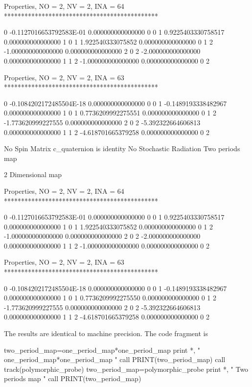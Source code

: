 \documentclass[english,12pt,article]{article} %
\begin{document}
{{{\begin{example2}
 Properties, NO =    2, NV =    2, INA =   64
 *********************************************

   0 -0.1127016653792583E-01   0.000000000000000       0  0
   1  0.9225403330758517       0.000000000000000       1  0
   1   1.922540333075852       0.000000000000000       0  1
   2  -1.000000000000000       0.000000000000000       2  0
   2  -2.000000000000000       0.000000000000000       1  1
   2  -1.000000000000000       0.000000000000000       0  2


 Properties, NO =    2, NV =    2, INA =   63
 *********************************************

   0 -0.1084202172485504E-18   0.000000000000000       0  0
   1 -0.1489193338482967       0.000000000000000       1  0
   1  0.7736209992275551       0.000000000000000       0  1
   2  -1.773620999227555       0.000000000000000       2  0
   2  -5.392322664606813       0.000000000000000       1  1
   2  -4.618701665379258       0.000000000000000       0  2

  No Spin Matrix
  c_quaternion is identity
 No Stochastic Radiation
  Two periods map

           2  Dimensional map

 Properties, NO =    2, NV =    2, INA =   64
 *********************************************

   0 -0.1127016653792583E-01   0.000000000000000       0  0
   1  0.9225403330758517       0.000000000000000       1  0
   1   1.922540333075852       0.000000000000000       0  1
   2  -1.000000000000000       0.000000000000000       2  0
   2  -2.000000000000000       0.000000000000000       1  1
   2  -1.000000000000000       0.000000000000000       0  2


 Properties, NO =    2, NV =    2, INA =   63
 *********************************************

   0 -0.1084202172485504E-18   0.000000000000000       0  0
   1 -0.1489193338482967       0.000000000000000       1  0
   1  0.7736209992275550       0.000000000000000       0  1
   2  -1.773620999227555       0.000000000000000       2  0
   2  -5.392322664606813       0.000000000000000       1  1
   2  -4.618701665379258       0.000000000000000       0  2
\end{example2}

The results are identical to machine precision.  The code fragment is
\begin{code}
 two_period_map=one_period_map*one_period_map
 print *, " one_period_map*one_period_map "
 call PRINT(two_period_map)
 call track(polymorphic_probe)
 two_period_map=polymorphic_probe
 print *, " Two periods map "
 call PRINT(two_period_map)
\end{code}

}}}
\end{document}
